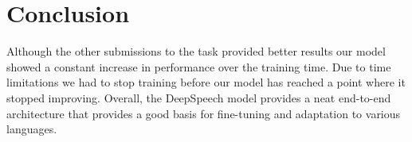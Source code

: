 \section{Conclusion}
Although the other submissions to the task provided better results our model showed a constant increase in performance over the training time. Due to time limitations we had to stop training before our model has reached a point where it stopped improving. Overall, the DeepSpeech model provides a neat end-to-end architecture that provides a good basis for fine-tuning and adaptation to various languages.   